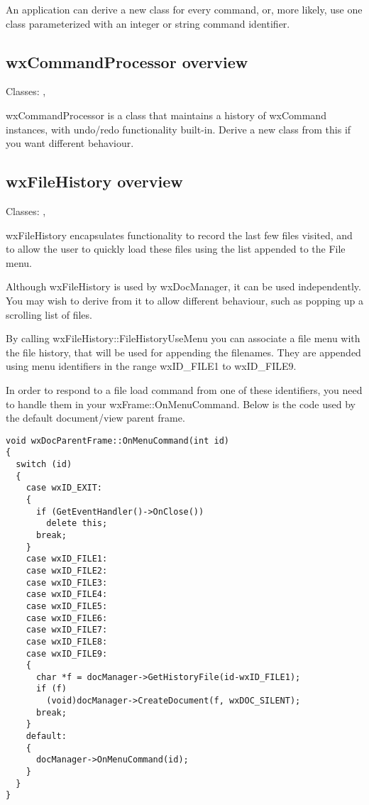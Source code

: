 An application can derive a new class for every command, or, more likely, use
one class parameterized with an integer or string command identifier.

\subsection{wxCommandProcessor overview}\label{wxcommandprocessoroverview}


Classes: , 

wxCommandProcessor is a class that maintains a history of wxCommand
instances, with undo/redo functionality built-in. Derive a new class from this
if you want different behaviour.

\subsection{wxFileHistory overview}\label{wxfilehistoryoverview}


Classes: , 

wxFileHistory encapsulates functionality to record the last few files visited, and
to allow the user to quickly load these files using the list appended to the File menu.

Although wxFileHistory is used by wxDocManager, it can be used independently. You may wish
to derive from it to allow different behaviour, such as popping up a scrolling
list of files.

By calling wxFileHistory::FileHistoryUseMenu you can associate a file menu with
the file history, that will be used for appending the filenames. They are
appended using menu identifiers in the range wxID\_FILE1 to wxID\_FILE9.

In order to respond to a file load command from one of these identifiers,
you need to handle them in your wxFrame::OnMenuCommand. Below is the
code used by the default document/view parent frame.

\begin{verbatim}
void wxDocParentFrame::OnMenuCommand(int id)
{
  switch (id)
  {
    case wxID_EXIT:
    {
      if (GetEventHandler()->OnClose())
        delete this;
      break;
    }
    case wxID_FILE1:
    case wxID_FILE2:
    case wxID_FILE3:
    case wxID_FILE4:
    case wxID_FILE5:
    case wxID_FILE6:
    case wxID_FILE7:
    case wxID_FILE8:
    case wxID_FILE9:
    {
      char *f = docManager->GetHistoryFile(id-wxID_FILE1);
      if (f)
        (void)docManager->CreateDocument(f, wxDOC_SILENT);
      break;
    }
    default:
    {
      docManager->OnMenuCommand(id);
    }
  }
}
\end{verbatim}

